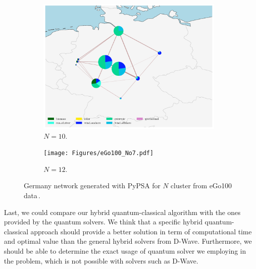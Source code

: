 \begin{figure}[H]
\begin{subfigure}[c]{0.5\linewidth}
\includegraphics[width=\linewidth]{Figures/eGo100_No6.pdf}
\caption{$N=10$.}
\label{fig:3c}
\end{subfigure}\hfill    
\begin{subfigure}[c]{0.5\linewidth}
\texttt{[image: Figures/eGo100\_No7.pdf]}
\caption{$N=12$.}
\label{fig:3d}
\end{subfigure}
    
\caption{Germany network generated with PyPSA for $N$ cluster from eGo100 data\,\cite{Mueller2018}.}
\label{fig:GeneralNetworks}
\end{figure}
Last, we could compare our hybrid quantum-classical algorithm with the ones provided by the quantum solvers. We think that a specific hybrid quantum-classical approach should provide a better solution in term of computational time and optimal value than the general hybrid solvers from D-Wave. Furthermore, we should be able to determine the exact usage of quantum solver we employing in the problem, which is not possible with solvers such as D-Wave.